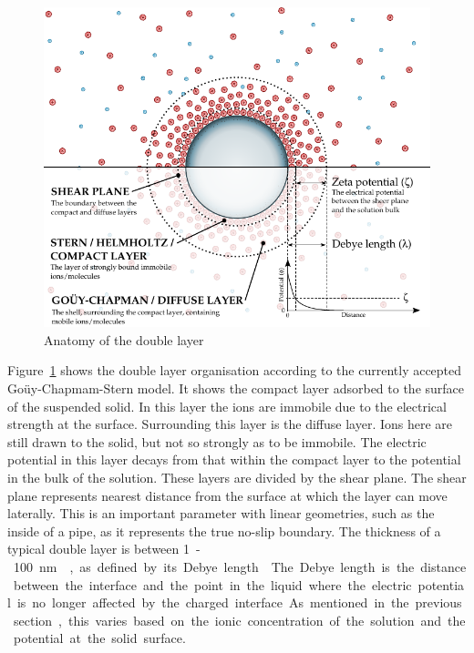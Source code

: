       \begin{figure}
        \begin{center}
          \includegraphics{content/introduction/graphics/doubleLayer_version2}
        \end{center}
        \caption{Anatomy of the double layer}
        \label{fig:doubleLayer_anatomy}
      \end{figure}
      Figure~\ref{fig:doubleLayer_anatomy} shows the double layer organisation according to the currently accepted Goüy-Chapmam-Stern model.
      It shows the compact layer adsorbed to the surface of the suspended solid.
      In this layer the ions are immobile due to the electrical strength at the surface.
      Surrounding this layer is the diffuse layer.
      Ions here are still drawn to the solid, but not so strongly as to be immobile.
      The electric potential in this layer decays from that within the compact layer to the potential in the bulk of the solution.
      These layers are divided by the shear plane.
      The shear plane represents nearest distance from the surface at which the layer can move laterally.
      This is an important parameter with linear geometries, such as the inside of a pipe, as it represents the true no-slip boundary.
      The thickness of a typical double layer is between \SI{1}-\SI{100}{\nano\meter}~\cite{Jiang2010}, as defined by its Debye length~\cite{Israelachvili2011}.
      The Debye length is the distance between the interface and the point in the liquid where the electric potential is no longer affected by the charged interface.
      As mentioned in the previous section, this varies based on the ionic concentration of the solution and the potential at the solid surface.


